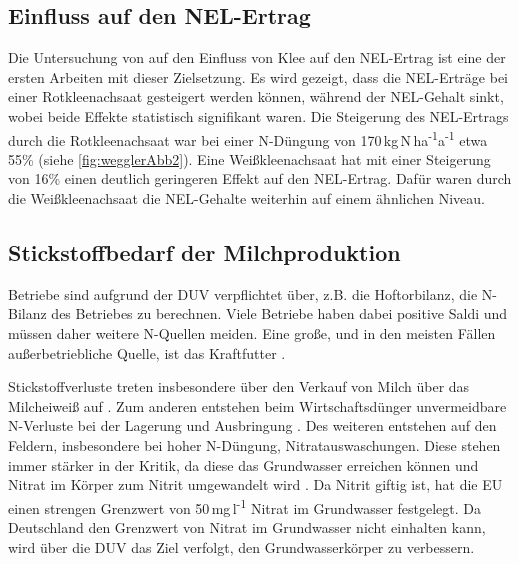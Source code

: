 \subsection{Einfluss auf den \acl{NEL}-Ertrag}
\label{subsec:NEL}
Die Untersuchung von \textcite{weggler2050leguminosen} auf den Einfluss von Klee auf den \ac{NEL}-Ertrag ist eine der ersten Arbeiten mit dieser Zielsetzung.
Es wird gezeigt, dass die \ac{NEL}-Erträge bei einer Rotkleenachsaat gesteigert werden können, während der \ac{NEL}-Gehalt sinkt, wobei beide Effekte statistisch signifikant waren.
Die Steigerung des \ac{NEL}-Ertrags durch die Rotkleenachsaat war bei einer N-Düngung von 170\,kg\,N\,ha\textsuperscript{-1}a\textsuperscript{-1} etwa 55\% (siehe \cref{fig:wegglerAbb2}).
Eine Weißkleenachsaat hat mit einer Steigerung von 16\% einen deutlich geringeren Effekt auf den \ac{NEL}-Ertrag.
Dafür waren durch die Weißkleenachsaat die \ac{NEL}-Gehalte weiterhin auf einem ähnlichen Niveau.


\subsection{Stickstoffbedarf der Milchproduktion}
\label{subsec:Stickstoff}
Betriebe sind aufgrund der \ac{DUV} verpflichtet über, z.B. die Hoftorbilanz, die N-Bilanz des Betriebes zu berechnen.
Viele Betriebe haben dabei positive Saldi \parencite[7ff.]{lellmann2005untersuchungen} und müssen daher weitere N-Quellen meiden.
Eine große, und in den meisten Fällen außerbetriebliche Quelle, ist das Kraftfutter \parencite[62]{lellmann2005untersuchungen}.

Stickstoffverluste treten insbesondere über den Verkauf von Milch über das Milcheiweiß auf \parencite[209]{Windisch1989}.
Zum anderen entstehen beim Wirtschaftsdünger unvermeidbare N-Verluste bei der Lagerung und Ausbringung \parencite[387]{Quentin1988}.
Des weiteren entstehen auf den Feldern, insbesondere bei hoher N-Düngung, Nitratauswaschungen.
Diese stehen immer stärker in der Kritik, da diese das Grundwasser erreichen können und Nitrat im Körper zum Nitrit umgewandelt wird \parencite[390f.]{Quentin1988}.
Da Nitrit giftig ist, hat die \ac{EU} einen strengen Grenzwert von 50\,mg\,l\textsuperscript{-1} Nitrat im Grundwasser festgelegt.
Da Deutschland den Grenzwert von Nitrat im Grundwasser nicht einhalten kann, wird über die \ac{DUV} das Ziel verfolgt, den Grundwasserkörper zu verbessern.


